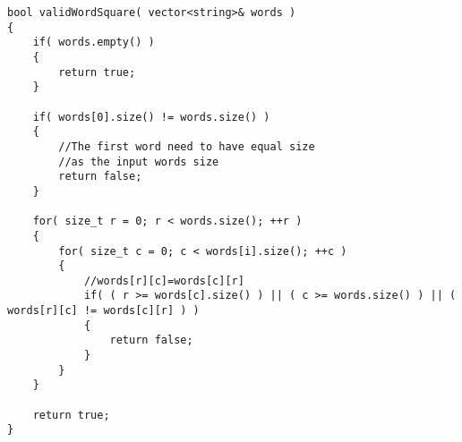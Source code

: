 \setcounter{lstlisting}{0}
\begin{lstlisting}[style=customc, caption={Matrix Compare}]
bool validWordSquare( vector<string>& words )
{
    if( words.empty() )
    {
        return true;
    }

    if( words[0].size() != words.size() )
    {
        //The first word need to have equal size
        //as the input words size
        return false;
    }

    for( size_t r = 0; r < words.size(); ++r )
    {
        for( size_t c = 0; c < words[i].size(); ++c )
        {
            //words[r][c]=words[c][r]
            if( ( r >= words[c].size() ) || ( c >= words.size() ) || ( words[r][c] != words[c][r] ) )
            {
                return false;
            }
        }
    }

    return true;
}

\end{lstlisting}
